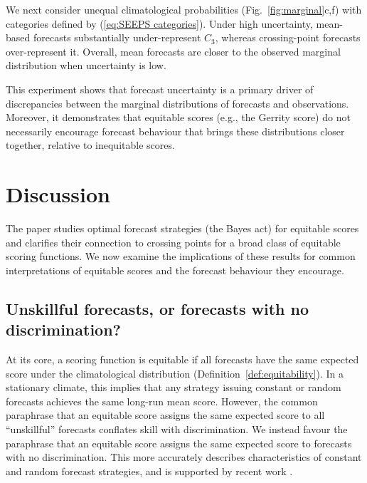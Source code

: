 \documentclass[10pt]{article} %
\theoremstyle{theorem}
\theoremstyle{definition}
\begin{document}
We next consider unequal climatological probabilities (Fig.~\ref{fig:marginal}c,f) with categories defined by (\ref{eq:SEEPS categories}). Under high uncertainty, mean-based forecasts substantially under-represent $C_3$, whereas crossing-point forecasts over-represent it. Overall, mean forecasts are closer to the observed marginal distribution when uncertainty is low.

This experiment shows that forecast uncertainty is a primary driver of discrepancies between the marginal distributions of forecasts and observations. Moreover, it demonstrates that equitable scores (e.g., the Gerrity score) do not necessarily encourage forecast behaviour that brings these distributions closer together, relative to inequitable scores.

\section{Discussion}\label{s:discussion}

The paper studies optimal forecast strategies (the Bayes act) for equitable scores and clarifies their connection to crossing points for a broad class of equitable scoring functions. We now examine the implications of these results for common interpretations of equitable scores and the forecast behaviour they encourage.

\subsection{Unskillful forecasts, or forecasts with no discrimination?}\label{ss:unskillful}

At its core, a scoring function is equitable if all forecasts have the same expected score under the climatological distribution (Definition~\ref{def:equitability}). In a stationary climate, this implies that any strategy issuing constant or random forecasts achieves the same long-run mean score. However, the common paraphrase that an equitable score assigns the same expected score to all ``unskillful'' forecasts \citep{jolliffe2008impenetrable, hogan2010equitability, rodwell2010new, rodwell2011peirce} conflates skill with discrimination. We instead favour the paraphrase that an equitable score assigns the same expected score to forecasts with no discrimination. This more accurately describes characteristics of constant and random forecast strategies, and is supported by recent work \citep[Appendix~C]{bouallegue2025self}.
\end{document}
